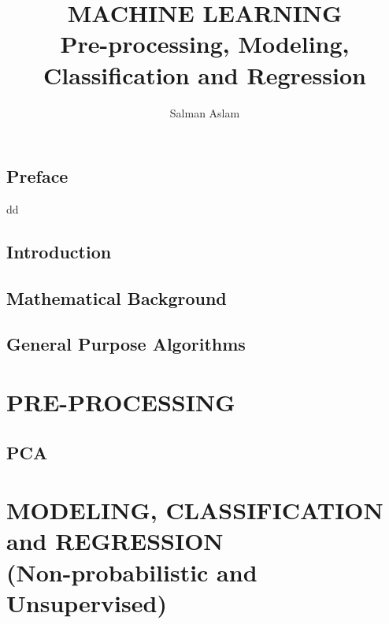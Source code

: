 \documentclass{book}
\title{MACHINE LEARNING\\Pre-processing, Modeling, Classification and Regression}
\author{Salman Aslam}
\date{}
\begin{document}
\maketitle

\chapter*{Preface}

dd

\tableofcontents



\chapter{Introduction}

\chapter{Mathematical Background}

\chapter{General Purpose Algorithms}






\part{PRE-PROCESSING}
\chapter{PCA}


\part{MODELING, CLASSIFICATION and REGRESSION\\(Non-probabilistic and Unsupervised)}
\end{document}
